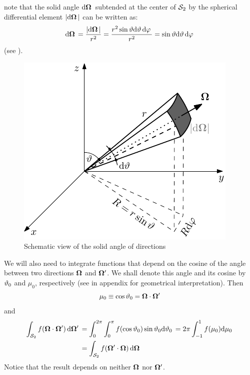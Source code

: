note that the solid angle $\d{\bomega}$ subtended at the center of $\Sphere$ by the spherical differential element
$\abs{\d{\bomega}}$ can be written as:
$$
	\d{\bomega} = \frac{\abs{\d{\bomega}}}{r^2} = \frac{r^2 \sint \d{\polar}\d{\azimuthal}}{r^2} =  \sint
	\d{\polar}\d{\azimuthal} $$
(see ).
\begin{figure}[!hbt]
    \centering
    \includegraphics[scale=1.275]{element}
    \caption[Solid angle]{Schematic view of the solid angle of directions}
    \label{fig:element}
\end{figure}
We will also need to integrate functions that depend on the cosine of the angle between two 
directions $\bomega$ and $\bomega'$. We shall denote this angle and its cosine by $\polar_0$ and $\mu_0$, respectively
(see  in appendix for geometrical interpretation).
Then
$$
	\mu_0 \equiv \cos \polar_0 = \bomega\cdot\bomega'
$$
and
\begin{equation}\label{eq:invint}
\begin{aligned}
	\intA[']{f(\bomega\cdot\bomega')} &= \int_{0}^{2\pi} \int_{0}^{\pi}
		f(\cos \polar_0) \sin \polar_0\d{\polar_0} = 2\pi \muint[_0]{f(\mu_0)}\\
		&= \intA{f(\bomega'\cdot\bomega)}
\end{aligned}
\end{equation}
Notice that the result depends on neither $\bomega$ nor $\bomega'$.

